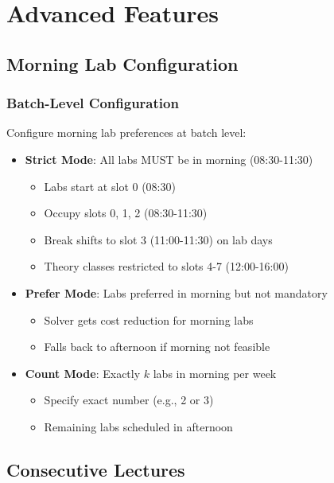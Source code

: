 \documentclass[12pt,a4paper]{article}
\begin{document}
\section{Advanced Features}

\subsection{Morning Lab Configuration}

\subsubsection{Batch-Level Configuration}
Configure morning lab preferences at batch level:

\begin{itemize}
    \item \textbf{Strict Mode}: All labs MUST be in morning (08:30-11:30)
    \begin{itemize}
        \item Labs start at slot 0 (08:30)
        \item Occupy slots 0, 1, 2 (08:30-11:30)
        \item Break shifts to slot 3 (11:00-11:30) on lab days
        \item Theory classes restricted to slots 4-7 (12:00-16:00)
    \end{itemize}
    
    \item \textbf{Prefer Mode}: Labs preferred in morning but not mandatory
    \begin{itemize}
        \item Solver gets cost reduction for morning labs
        \item Falls back to afternoon if morning not feasible
    \end{itemize}
    
    \item \textbf{Count Mode}: Exactly $k$ labs in morning per week
    \begin{itemize}
        \item Specify exact number (e.g., 2 or 3)
        \item Remaining labs scheduled in afternoon
    \end{itemize}
\end{itemize}


\subsection{Consecutive Lectures}
\end{document}
